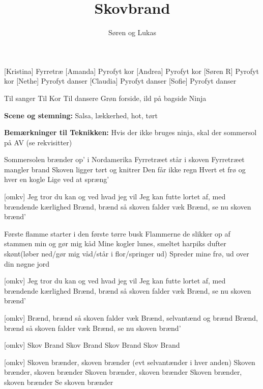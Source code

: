 \documentclass[a4paper,11pt]{article}
\title{Skovbrand}
\author{Søren og Lukas}
\begin{document}
\maketitle

\begin{roles}
    [Kristina] Fyrretræ
[Amanda] Pyrofyt kor
[Andrea] Pyrofyt kor
[Søren R] Pyrofyt kor
[Nethe] Pyrofyt danser
[Claudia] Pyrofyt danser
[Sofie] Pyrofyt danser
\end{roles}

\begin{props}
     Til sanger
     Til Kor
     Til dansere
     Grøn forside, ild på bagside
     Ninja
\end{props}

\textbf{Scene og stemning:} Salsa, lækkerhed, hot, tørt

\vspace{0.3cm}

\textbf{Bemærkninger til Teknikken:} Hvis der ikke bruges ninja, skal der sommersol på AV (se rekvisitter)

\begin{song}
   Sommersolen brænder op’ i Nordamerika
Fyrretræet står i skoven
Fyrretræet mangler brand
Skoven ligger tørt og knitrer
Den får ikke regn
Hvert et frø og hver en kogle
Lige ved at spræng’

  [omkv] Jeg tror du kan og ved hvad jeg vil
Jeg kan futte lortet af, med brændende kærlighed
Brænd, brænd så skoven falder væk
Brænd, se nu skoven brænd’

 Første flamme starter i den første tørre busk
Flammerne de slikker op af stammen min og gør mig kåd
Mine kogler lunes, smeltet harpiks dufter skønt(løber ned/gør mig våd/står i flor/springer ud)
Spreder mine frø, ud over din nøgne jord

[omkv] Jeg tror du kan og ved hvad jeg vil
Jeg kan futte lortet af, med brændende kærlighed
Brænd, brænd så skoven falder væk
Brænd, se nu skoven brænd’

[omkv] Brænd, brænd så skoven falder væk
Brænd, selvantænd og brænd
Brænd, brænd så skoven falder væk
Brænd, se nu skoven brænd’


[omkv] Skov
Brand
Skov
Brand
Skov
Brand
Skov
Brand


[omkv] Skoven brænder, skoven brænder (evt selvantænder i hver anden) 
Skoven brænder, skoven brænder
Skoven brænder, skoven brænder
Skoven brænder, skoven brænder
Se skoven brænder



\end{song}
\end{document}
